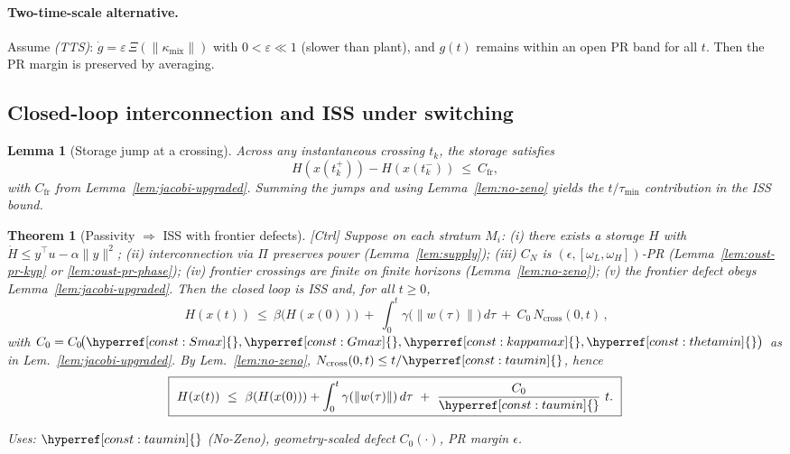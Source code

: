 \documentclass[10pt]{article}
\newcommand{\uses}[1]{\par\smallskip\noindent\textit{Uses: }#1\par\smallskip}
\newcommand{\constref}[1]{%
  \hyperref[const:#1]{\ensuremath{\csname constsym#1\endcsname}}%
}
\newtheorem{lemma}{Lemma}
\newtheorem{theorem}{Theorem}
\begin{document}
\paragraph{Two-time-scale alternative.}
Assume \emph{(TTS)}: $\dot g = \varepsilon\,\Xi(\|\kappa_{\mathrm{mix}}\|)$ with $0<\varepsilon\ll 1$ (slower than plant), and $g(t)$ remains within an open PR band for all $t$. Then the PR margin is preserved by averaging.

\subsection{Closed-loop interconnection and ISS under switching}

\begin{lemma}[Storage jump at a crossing]\label{lem:storage-jump}
Across any instantaneous crossing $t_k$, the storage satisfies
\[
H(x(t_k^+))-H(x(t_k^-))\ \le\ C_{\mathrm{fr}},
\]
with $C_{\mathrm{fr}}$ from Lemma~\ref{lem:jacobi-upgraded}. Summing the jumps and using Lemma~\ref{lem:no-zeno} yields the $t/\tau_{\min}$ contribution in the ISS bound.
\end{lemma}

\begin{theorem}[Passivity $\Rightarrow$ ISS with frontier defects]\label{thm:ISS}
\emph{[\textup{Ctrl}]} Suppose on each stratum $M_i$: 
(i) there exists a storage $H$ with $\dot H\le y^\top u - \alpha\|y\|^2$; 
(ii) interconnection via $\Pi$ preserves power (Lemma~\ref{lem:supply}); 
(iii) $C_N$ is $(\epsilon,[\omega_L,\omega_H])$-PR (Lemma~\ref{lem:oust-pr-kyp} or \ref{lem:oust-pr-phase}); 
(iv) frontier crossings are finite on finite horizons (Lemma~\ref{lem:no-zeno}); 
(v) the frontier defect obeys Lemma~\ref{lem:jacobi-upgraded}. Then the closed loop is ISS and, for all $t\ge0$,
\[
\boxed{\
H(x(t)) \ \le\ \beta\!\big(H(x(0))\big) \ +\ \int_0^t \gamma\!\big(\|w(\tau)\|\big)\,d\tau \ +\ C_0\,N_{\mathrm{cross}}(0,t)\,,
}
\]
with $C_0=C_0\!\big(\constref{Smax},\constref{Gmax},\constref{kappamax},\constref{thetamin}\big)$ as in Lem.~\ref{lem:jacobi-upgraded}. 
By Lem.~\ref{lem:no-zeno}, $N_{\mathrm{cross}}(0,t)\le t/\constref{taumin}$, hence
\[
\boxed{\ H(x(t)) \ \le\ \beta(H(x(0))) + \int_0^t \gamma(\|w(\tau)\|)\,d\tau \ +\ \frac{C_0}{\constref{taumin}}\ t.\ }
\]
\uses{ $\constref{taumin}$ (No-Zeno), geometry-scaled defect $C_0(\cdot)$, PR margin $\epsilon$.}
\end{theorem}
\end{document}
